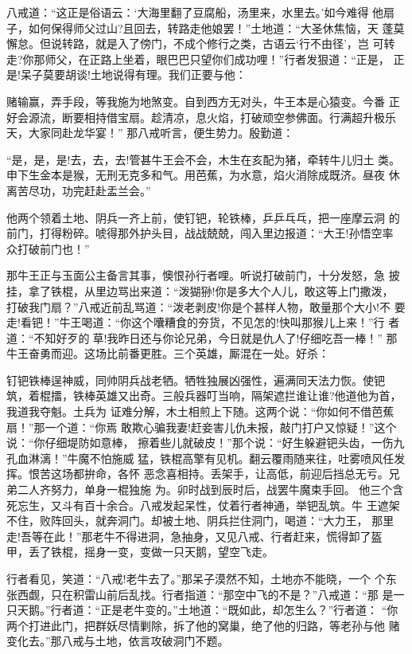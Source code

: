 八戒道：“这正是俗语云：‘大海里翻了豆腐船，汤里来，水里去。’如今难得
他扇子，如何保得师父过山?且回去，转路走他娘罢！”土地道：“大圣休焦恼，天
蓬莫懈怠。但说转路，就是入了傍门，不成个修行之类，古语云‘行不由径’，岂
可转走?你那师父，在正路上坐着，眼巴巴只望你们成功哩！”行者发狠道：“正是，
正是!呆子莫要胡谈!土地说得有理。我们正要与他：

赌输赢，弄手段，等我施为地煞变。自到西方无对头，牛王本是心猿变。今番
正好会源流，断要相持借宝扇。趁清凉，息火焰，打破顽空参佛面。行满超升极乐
天，大家同赴龙华宴！”
那八戒听言，便生势力。殷勤道：

“是，是，是!去，去，去!管甚牛王会不会，木生在亥配为猪，牵转牛儿归土
类。申下生金本是猴，无刑无克多和气。用芭蕉，为水意，焰火消除成既济。昼夜
休离苦尽功，功完赶赴盂兰会。”

他两个领着土地、阴兵一齐上前，使钉钯，轮铁棒，乒乒乓乓，把一座摩云洞
的前门，打得粉碎。唬得那外护头目，战战兢兢，闯入里边报道：“大王!孙悟空率
众打破前门也！”

那牛王正与玉面公主备言其事，懊恨孙行者哩。听说打破前门，十分发怒，急
披挂，拿了铁棍，从里边骂出来道：“泼猢狲!你是多大个人儿，敢这等上门撒泼，
打破我门扇？”八戒近前乱骂道：“泼老剥皮!你是个甚样人物，敢量那个大小!不
要走!看钯！”牛王喝道：“你这个囔糟食的夯货，不见怎的!快叫那猴儿上来！”行
者道：“不知好歹的草!我昨日还与你论兄弟，今日就是仇人了!仔细吃吾一棒！”
那牛王奋勇而迎。这场比前番更胜。三个英雄，厮混在一处。好杀：

钉钯铁棒逞神威，同帅阴兵战老牺。牺牲独展凶强性，遍满同天法力恢。使钯
筑，着棍擂，铁棒英雄又出奇。三般兵器叮当响，隔架遮拦谁让谁?他道他为首，
我道我夺魁。土兵为
证难分解，木土相煎上下随。这两个说：“你如何不借芭蕉扇！”那一个道：“你焉
敢欺心骗我妻!赶妾害儿仇未报，敲门打户又惊疑！”这个说：“你仔细堤防如意棒，
擦着些儿就破皮！”那个说：“好生躲避钯头齿，一伤九孔血淋漓！”牛魔不怕施威
猛，铁棍高擎有见机。翻云覆雨随来往，吐雾喷风任发挥。恨苦这场都拚命，各怀
恶念喜相持。丢架手，让高低，前迎后挡总无亏。兄弟二人齐努力，单身一棍独施
为。卯时战到辰时后，战罢牛魔束手回。
他三个含死忘生，又斗有百十余合。八戒发起呆性，仗着行者神通，举钯乱筑。牛
王遮架不住，败阵回头，就奔洞门。却被土地、阴兵拦住洞门，喝道：“大力王，
那里走!吾等在此！”那老牛不得进洞，急抽身，又见八戒、行者赶来，慌得卸了盔
甲，丢了铁棍，摇身一变，变做一只天鹅，望空飞走。

行者看见，笑道：“八戒!老牛去了。”那呆子漠然不知，土地亦不能晓，一个
个东张西觑，只在积雷山前后乱找。行者指道：“那空中飞的不是？”八戒道：“那
是一只天鹅。”行者道：“正是老牛变的。”土地道：“既如此，却怎生么？”行者道：
“你两个打进此门，把群妖尽情剿除，拆了他的窝巢，绝了他的归路，等老孙与他
赌变化去。”那八戒与土地，依言攻破洞门不题。

